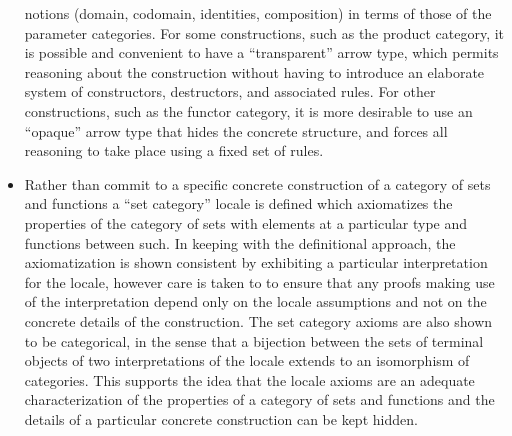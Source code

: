 \documentclass[11pt,notitlepage,a4paper]{report}
\begin{document}
\begin{itemize}
  notions (domain, codomain, identities, composition) in terms of those of the
  parameter categories.
  For some constructions, such as the product category, it is possible and convenient
  to have a ``transparent'' arrow type, which permits reasoning about the construction
  without having to introduce an elaborate system of constructors, destructors,
  and associated rules.  For other constructions, such as the functor category,
  it is more desirable to use an ``opaque'' arrow type that hides the concrete
  structure, and forces all reasoning to take place using a fixed set of rules.
\item  Rather than commit to a specific concrete construction of a category of sets and
  functions a ``set category'' locale is defined which axiomatizes the properties of the
  category of sets with elements at a particular type and functions between such.
  In keeping with the definitional approach, the axiomatization is shown consistent by
  exhibiting a particular interpretation for the locale, however care is taken to
  to ensure that any proofs making use of the interpretation depend only on the locale
  assumptions and not on the concrete details of the construction.  The set category
  axioms are also shown to be categorical, in the sense that a bijection between the sets
  of terminal objects of two interpretations of the locale extends to an isomorphism of
  categories.  This supports the idea that the locale axioms are an adequate
  characterization of the properties of a category of sets and functions and the details
  of a particular concrete construction can be kept hidden.
\end{itemize}
  
\end{document}
